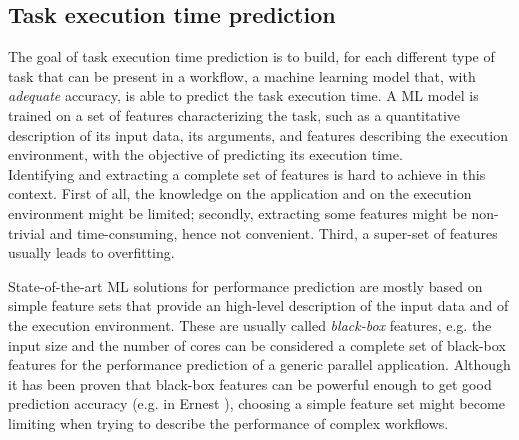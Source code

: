 \documentclass[a4paper, 10pt, conference]{ieeeconf}      %
\begin{document}
\subsection{Task execution time prediction}
\label{section:task_modeling}
The goal of task execution time  prediction is to build, for each different type of task that can be present in a workflow, a machine learning model that, with \textit{adequate} accuracy, is able to predict the task execution time.
A ML model is trained on a set of features characterizing the task, such as a quantitative description of its input data, its arguments, and features describing the execution environment, with the objective of predicting its execution time. \\
Identifying and extracting a complete set of features is hard to achieve in this context. First of all, the knowledge on the application and on the execution environment might be limited; secondly, extracting some features might be non-trivial and time-consuming, hence not convenient.  Third, a super-set of features usually leads to overfitting.

State-of-the-art ML solutions for performance prediction are mostly based on simple feature sets that provide an high-level description of the input data and of the execution environment. 
These are usually called \textit{black-box} features, e.g. the input size and the number of cores can be considered a complete set of black-box features for the performance prediction of a generic parallel application.
Although it has been proven that black-box features can be powerful enough to get good prediction accuracy (e.g. in Ernest \cite{ernest}), choosing a simple feature set might become limiting when trying to describe the performance of  complex workflows.
\end{document}
